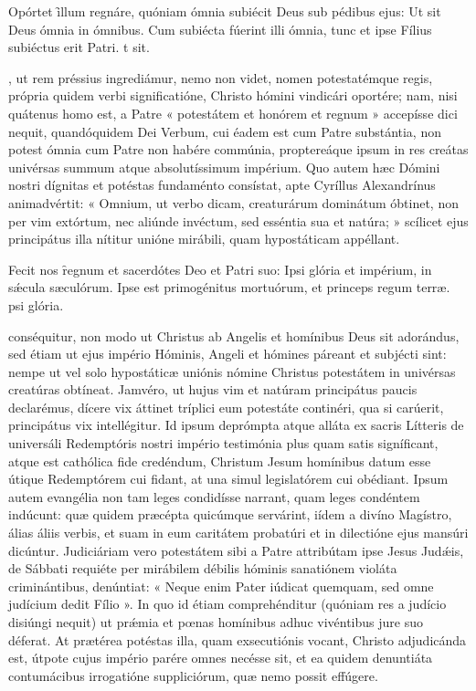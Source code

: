 \documentclass[fontsize=8pt,paper=A6,twoside,BCOR=1mm,DIV=22,headinclude]{scrarticle}
\begin{document}
\begin{multicols}{2}
{\R Opórtet \f illum regnáre, quóniam ómnia subiécit Deus sub pédibus ejus:
\red{*} Ut sit Deus ómnia in ómnibus.
\V Cum subiécta fúerint illi ómnia, tunc et ipse Fílius subiéctus erit Patri.
t sit.

, ut rem préssius ingrediámur, nemo non videt, nomen potestatémque regis, própria quidem verbi significatióne, Christo hómini vindicári oportére; nam, nisi quátenus homo est, a Patre « potestátem et honórem et regnum » accepísse dici nequit, quandóquidem Dei Verbum, cui éadem est cum Patre substántia, non potest ómnia cum Patre non habére commúnia, proptereáque ipsum in res creátas univérsas summum atque absolutíssimum impérium. Quo autem hæc Dómini nostri dígnitas et potéstas fundaménto consístat, apte Cyríllus Alexandrínus animadvértit: « Omnium, ut verbo dicam, creaturárum dominátum óbtinet, non per vim extórtum, nec aliúnde invéctum, sed esséntia sua et natúra; » scílicet ejus principátus illa nítitur unióne mirábili, quam hypostáticam appéllant.

\R Fecit nos \f regnum et sacerdótes Deo et Patri suo:
\red{*} Ipsi glória et impérium, in sǽcula sæculórum.
\V Ipse est primogénitus mortuórum, et princeps regum terræ.
psi glória.

}

 conséquitur, non modo ut Christus ab Angelis et homínibus Deus sit adorándus, sed étiam ut ejus império Hóminis, Angeli et hómines páreant et subjécti sint: nempe ut vel solo hypostáticæ uniónis nómine Christus potestátem in univérsas creatúras obtíneat. Jamvéro, ut hujus vim et natúram principátus paucis declarémus, dícere vix áttinet tríplici eum potestáte continéri, qua si carúerit, principátus vix intellégitur. Id ipsum deprómpta atque alláta ex sacris Lítteris de universáli Redemptóris nostri império testimónia plus quam satis signíficant, atque est cathólica fide credéndum, Christum Jesum homínibus datum esse útique Redemptórem cui fidant, at una simul legislatórem cui obédiant. Ipsum autem evangélia non tam leges condidísse narrant, quam leges condéntem indúcunt: quæ quidem præcépta quicúmque servárint, iídem a divíno Magístro, álias áliis verbis, et suam in eum caritátem probatúri et in dilectióne ejus mansúri dicúntur. Judiciáriam vero potestátem sibi a Patre attribútam ipse Jesus Judǽis, de Sábbati requiéte per mirábilem débilis hóminis sanatiónem violáta criminántibus, denúntiat: « Neque enim Pater iúdicat quemquam, sed omne judícium dedit Fílio ». In quo id étiam comprehénditur (quóniam res a judício disiúngi nequit) ut prǽmia et pœnas homínibus adhuc vivéntibus jure suo déferat. At prætérea potéstas illa, quam exsecutiónis vocant, Christo adjudicánda est, útpote cujus império parére omnes necésse sit, et ea quidem denuntiáta contumácibus irrogatióne suppliciórum, quæ nemo possit effúgere.


\end{multicols}
\end{document}
